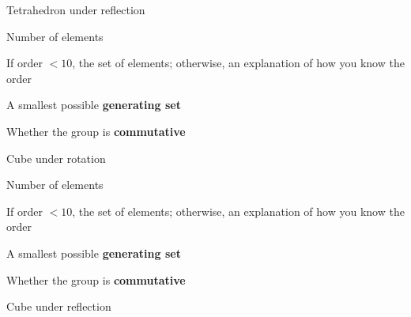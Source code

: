 \documentclass[../gatm_answers.tex]{subfiles}
\begin{document}
\begin{outer_problem}
\item Tetrahedron under reflection
\end{outer_problem}

\begin{inner_problem}[start=1]
\item Number of elements
\end{inner_problem}

\begin{inner_problem}
\item If order $< 10$, the set of elements; otherwise, an explanation of how you know the order
\end{inner_problem}

\begin{inner_problem}
\item A smallest possible \textbf{generating set}
\end{inner_problem}

\begin{inner_problem}
\item Whether the group is \textbf{commutative}
\end{inner_problem}

\begin{outer_problem}
\item Cube under rotation
\end{outer_problem}

\begin{inner_problem}[start=1]
\item Number of elements
\end{inner_problem}

\begin{inner_problem}
\item If order $< 10$, the set of elements; otherwise, an explanation of how you know the order
\end{inner_problem}

\begin{inner_problem}
\item A smallest possible \textbf{generating set}
\end{inner_problem}

\begin{inner_problem}
\item Whether the group is \textbf{commutative}
\end{inner_problem}

\begin{outer_problem}
\item Cube under reflection
\end{outer_problem}
\end{document}
